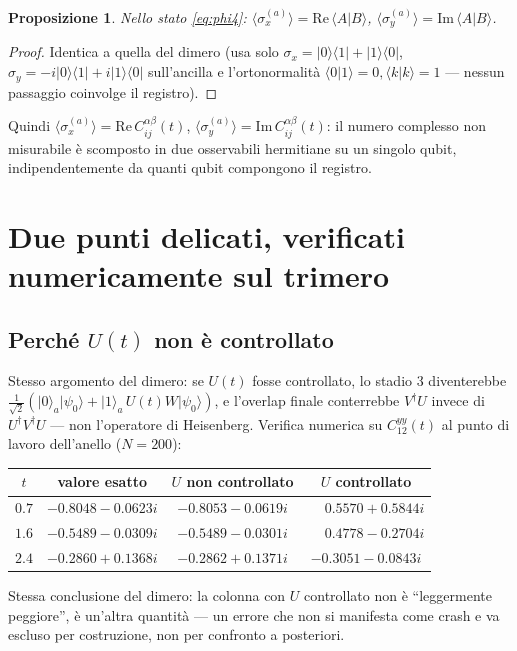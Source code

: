 \documentclass[11pt,a4paper]{article}
\newtheorem{proposizione}{Proposizione}
\newcommand{\ket}[1]{\lvert #1\rangle}
\newcommand{\bra}[1]{\langle #1\rvert}
\begin{document}
\begin{proposizione}
Nello stato \eqref{eq:phi4}: $\langle\sigma_x^{(a)}\rangle=\mathrm{Re}\,\langle A|B\rangle$,
$\langle\sigma_y^{(a)}\rangle=\mathrm{Im}\,\langle A|B\rangle$.
\end{proposizione}
\begin{proof}
Identica a quella del dimero (usa solo $\sigma_x=\ket0\!\bra1+\ket1\!\bra0$,
$\sigma_y=-i\ket0\!\bra1+i\ket1\!\bra0$ sull'ancilla e l'ortonormalità
$\langle0|1\rangle=0,\langle k|k\rangle=1$ --- nessun passaggio coinvolge il registro).
\end{proof}

Quindi $\langle\sigma_x^{(a)}\rangle=\mathrm{Re}\,C_{ij}^{\alpha\beta}(t)$,
$\langle\sigma_y^{(a)}\rangle=\mathrm{Im}\,C_{ij}^{\alpha\beta}(t)$: il numero complesso non
misurabile è scomposto in due osservabili hermitiane su un singolo qubit, indipendentemente da
quanti qubit compongono il registro.

\section{Due punti delicati, verificati numericamente sul trimero}

\subsection{Perché $U(t)$ non è controllato}

Stesso argomento del dimero: se $U(t)$ fosse controllato, lo stadio 3 diventerebbe
$\tfrac1{\sqrt2}(\ket0_a\ket{\psi_0}+\ket1_a\,U(t)W\ket{\psi_0})$, e l'overlap finale conterrebbe
$V^\dagger U$ invece di $U^\dagger V^\dagger U$ --- non l'operatore di Heisenberg. Verifica
numerica su $C_{12}^{yy}(t)$ al punto di lavoro dell'anello ($N=200$):

\begin{center}
\begin{tabular}{cccc}
\toprule
$t$ & valore esatto & $U$ non controllato & $U$ controllato \\
\midrule
$0.7$ & $-0.8048-0.0623i$ & $-0.8053-0.0619i$ & $\phantom{-}0.5570+0.5844i$ \\
$1.6$ & $-0.5489-0.0309i$ & $-0.5489-0.0301i$ & $\phantom{-}0.4778-0.2704i$ \\
$2.4$ & $-0.2860+0.1368i$ & $-0.2862+0.1371i$ & $-0.3051-0.0843i$ \\
\bottomrule
\end{tabular}
\end{center}
Stessa conclusione del dimero: la colonna con $U$ controllato non è ``leggermente peggiore'', è
un'altra quantità --- un errore che non si manifesta come crash e va escluso per costruzione, non
per confronto a posteriori.
\end{document}
